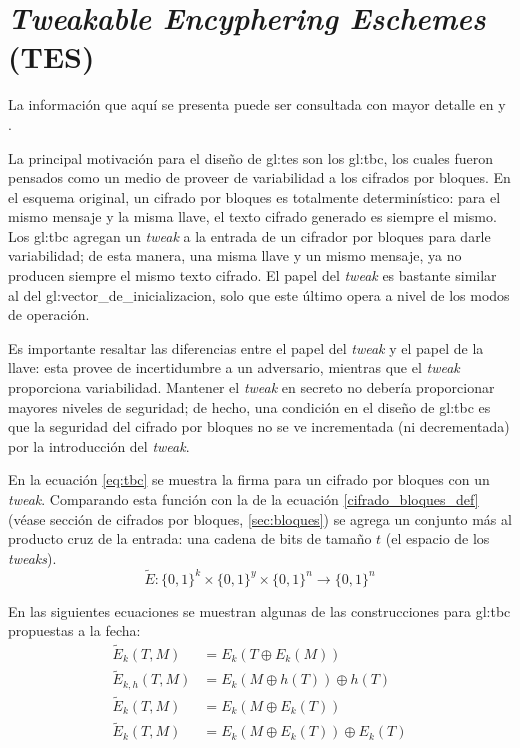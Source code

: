 %
%

\section{\textit{Tweakable Encyphering Eschemes} (TES)}
\label{sec:tes}

La información que aquí se presenta puede ser consultada con mayor detalle en
\cite{cifradores_de_disco} y \cite{tweaks}.

La principal motivación para el diseño de \gls{gl:tes} son los \gls{gl:tbc},
los cuales fueron pensados como un medio de proveer de variabilidad a
los cifrados por bloques. En el esquema original, un cifrado por bloques es
totalmente determinístico: para el mismo mensaje y la misma llave, el texto
cifrado generado es siempre el mismo. Los \gls{gl:tbc} agregan un
\textit{tweak} a la entrada de un cifrador por bloques para darle
variabilidad; de esta manera, una misma llave y un mismo mensaje, ya no
producen siempre el mismo texto cifrado. El papel del \textit{tweak} es
bastante similar al del \gls{gl:vector_de_inicializacion}, solo que este
último opera a nivel de los modos de operación.

Es importante resaltar las diferencias entre el papel del \textit{tweak} y el
papel de la llave: esta provee de incertidumbre a un adversario,
mientras que el \textit{tweak} proporciona variabilidad. Mantener el
\textit{tweak} en secreto no debería proporcionar mayores niveles de
seguridad; de hecho, una condición en el diseño de \gls{gl:tbc} es que la
seguridad del cifrado por bloques no se ve incrementada (ni decrementada) por
la introducción del \textit{tweak}.

En la ecuación \ref{eq:tbc} se muestra la firma para un cifrado por bloques
con un \textit{tweak}. Comparando esta función con la de la ecuación
\ref{cifrado_bloques_def} (véase sección de cifrados por bloques,
\ref{sec:bloques}) se agrega un conjunto más al producto cruz de la entrada:
una cadena de bits de tamaño $ t $ (el espacio de los \textit{tweaks}).
\begin{equation}
  \label{eq:tbc}
  \tilde{E}: \{0,1\}^k \times \{0,1\}^y \times \{0,1\}^n
  \longrightarrow \{0,1\}^n
\end{equation}

En las siguientes ecuaciones se muestran algunas de las construcciones para
\gls{gl:tbc} propuestas a la fecha:
\begin{align}
  \label{tbc_trivial}
  \tilde{E}_k(T, M) &= E_k(T \oplus E_k(M)) \\
  \label{tbc_lrw}
  \tilde{E}_{k, h}(T, M) &= E_k(M \oplus h(T)) \oplus h(T) \\
  \label{tbc_we}
  \tilde{E}_{k}(T, M) &= E_k(M \oplus E_k(T)) \\
  \label{tbc_xex}
  \tilde{E}_{k}(T, M) &= E_k(M \oplus E_k(T)) \oplus E_k(T)
\end{align}


